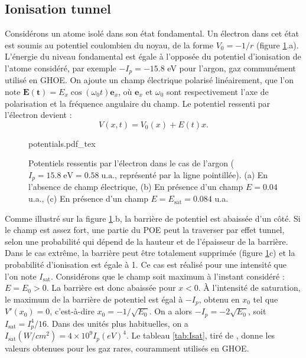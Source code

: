 \subsection{Ionisation tunnel}
Considérons un atome isolé dans son état fondamental. Un électron dans cet état est soumis au potentiel coulombien du noyau, de la forme $V_0 = -1/r$ (figure \ref{fig:ionization}.a). L'énergie du niveau fondamental est égale à l'opposée du potentiel d'ionisation de l'atome considéré, par exemple $-I_p=-15.8$ eV pour l'argon, gaz communément utilisé en GHOE. On ajoute un champ électrique polarisé linéairement, que l'on note $\bm{E(t)} = E_x \cos(\omega_0 t)\bm{e}_x$, où $\bm{e}_x$ et $\omega_0$ sont respectivement l'axe de polarisation et la fréquence angulaire du champ. Le potentiel ressenti par l'électron devient :
\begin{equation}
V(x,t) = V_0(x) + E(t)x.
\end{equation} 

\begin{figure}[!ht]
\centering
\def\svgwidth{\columnwidth}
{potentials.pdf_tex}
\caption{Potentiels ressentis par l'électron dans le cas de l'argon ($I_p = 15.8\; \text{eV} = 0.58\; \text{u.a.}$, représenté par la ligne pointillée). (a) En l'absence de champ électrique, (b) En présence d'un champ $E=0.04$ u.a., (c) En présence d'un champ $E=E_{\text{sat}}=0.084$ u.a.}
\label{fig:ionization}
\end{figure}

Comme illustré sur la figure \ref{fig:ionization}.b, la barrière de potentiel est abaissée d'un côté. Si le champ est assez fort, une partie du POE peut la traverser par effet tunnel, selon une probabilité qui dépend de la hauteur et de l'épaisseur de la barrière. Dans le cas extrême, la barrière peut être totalement supprimée (figure \ref{fig:ionization}c) et la probabilité d'ionisation est égale à 1. Ce cas est réalisé pour une intensité que l'on note $I_\text{sat}$. Considérons que le champ soit maximum à l'instant considéré : $E=E_0>0$. La barrière est donc abaissée pour $x<0$. \`A l'intensité de saturation, le maximum de la barrière de potentiel est égal à $-I_p$, obtenu en $x_0$ tel que $V'(x_0) = 0$, c'est-à-dire $x_0 = -1/\sqrt{E_0}$. On a alors $-I_p = -2\sqrt{E_0}$, soit $I_\text{sat} = I_p^4/16$. Dans des unités plus habituelles, on a $I_\text{sat}(\si{W/cm^2}) = 4\times10^9I_p(\si{eV})^4$. Le tableau \ref{tab:Isat}, tiré de , donne les valeurs obtenues pour les gaz rares, couramment utilisés en GHOE.

